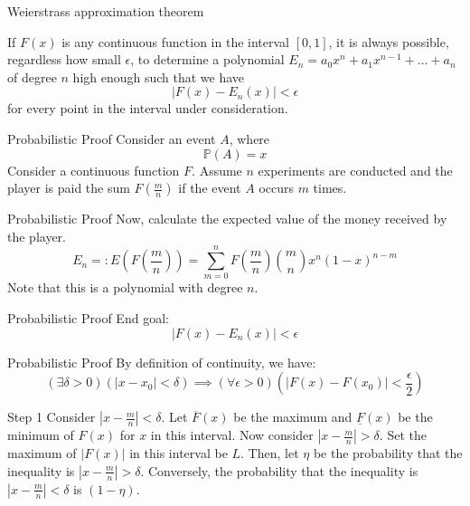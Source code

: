 \documentclass[mathserif,serif]{beamer}
\begin{document}
\begin{frame}{Weierstrass approximation theorem}
\begin{theorem}
If $F(x)$ is any continuous function in the interval $[0,1]$, it is always possible, regardless how small $\epsilon$, to determine a polynomial $E_n=a_0x^n+a_1x^{n-1}+\dots+a_n$ of degree $n$ high enough such that we have
\begin{equation*}
    |F(x)-E_n(x)|<\epsilon
\end{equation*}
for every point in the interval under consideration.
\end{theorem}
\end{frame}

\begin{frame}{Probabilistic Proof}
Consider an event $A$, where
$$\mathbb{P}(A)=x$$
Consider a continuous function $F$.
\newline 
Assume $n$ experiments are conducted and the player is paid the sum $F(\frac{m}{n})$ if the event $A$ occurs $m$ times.    
\end{frame}

\begin{frame}{Probabilistic Proof}
Now, calculate the expected value of the money received by the player.
\begin{equation*}
      E_n =:E(F(\frac{m}{n})) = \sum_{m=0}^{n} F \left( \frac{m}{n} \right) \binom{m}{n} x^n (1-x)^{n-m}
\end{equation*}
Note that this is a polynomial with degree $n$.
\end{frame}

\begin{frame}{Probabilistic Proof}
End goal:
\begin{equation*}
    |F(x)-E_n(x)|<\epsilon
\end{equation*}
\end{frame}

\begin{frame}{Probabilistic Proof}
By definition of continuity, we have:
\begin{equation*}
    (\exists\delta>0)(|x-x_0|<\delta)\implies(\forall\epsilon>0)(|F(x)-F(x_0)|<\frac{\epsilon}{2})
\end{equation*}
\end{frame}

\begin{frame}{Step 1}
Consider $|x-\frac{m}{n}|<\delta$.
\newline
Let $\overline{F}(x)$ be the maximum and $\underline{F}(x)$ be the minimum of $F(x)$ for $x$ in this interval.
\newline
Now consider $|x-\frac{m}{n}|>\delta$.
\newline
Set the maximum of $|F(x)|$ in this interval be $L$.
\newline
Then, let $\eta$ be the probability that the inequality is $|x-\frac{m}{n}|>\delta$. Conversely, the probability that the inequality is $|x-\frac{m}{n}|<\delta$ is $(1-\eta)$.
\end{frame}
\end{document}
